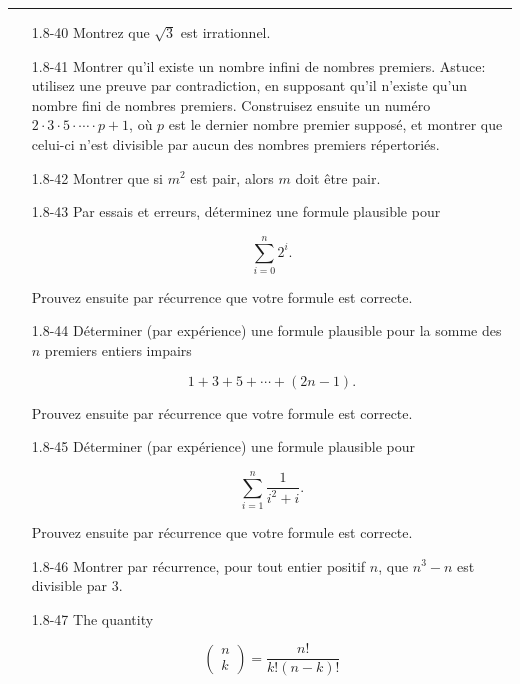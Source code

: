 \documentclass[10pt,twoside,a4paper]{book}
\begin{document}
\par\noindent\rule{\textwidth}{0.6pt}

\begin{enumerate}
  \item[1.8-40] Montrez que $\sqrt{3}$ est irrationnel.
  \item[1.8-41] Montrer qu'il existe un nombre infini de nombres premiers. Astuce: utilisez une preuve par contradiction, en supposant qu'il n'existe qu'un nombre fini de nombres premiers. 
  Construisez ensuite un numéro $2 \cdot 3 \cdot 5 \cdot \cdots \cdot p + 1$, où $p$ est le dernier nombre premier supposé, et montrer que celui-ci n'est divisible par aucun des nombres premiers répertoriés.
  \item[1.8-42] Montrer que si $m^2$ est pair, alors $m$ doit être pair.
  \item[1.8-43] Par essais et erreurs, déterminez une formule plausible pour
  
  \begin{equation*}
    \sum_{i=0}^{n}2^i.  
  \end{equation*}

  \noindent
  Prouvez ensuite par récurrence que votre formule est correcte.
  \item[1.8-44] Déterminer (par expérience) une formule plausible pour la somme des $n$ premiers entiers impairs
  
  \begin{equation*}
    1+3+5+ \cdots + (2n-1).
  \end{equation*}

  \noindent
  Prouvez ensuite par récurrence que votre formule est correcte.
  \item[1.8-45] Déterminer (par expérience) une formule plausible pour
  
  \begin{equation*}
    \sum_{i=1}^{n} \frac{1}{i^2+i}.
  \end{equation*}

  \noindent
  Prouvez ensuite par récurrence que votre formule est correcte.
  \item[1.8-46] Montrer par récurrence, pour tout entier positif $n$, que $n^3-n$ est divisible par 3.
  \item[1.8-47] The quantity

  \begin{equation*}
    \begin{pmatrix}
      n \\
      k 
    \end{pmatrix} = \frac{n!}{k!(n-k)!}
  \end{equation*}


\end{enumerate}
\end{document}
